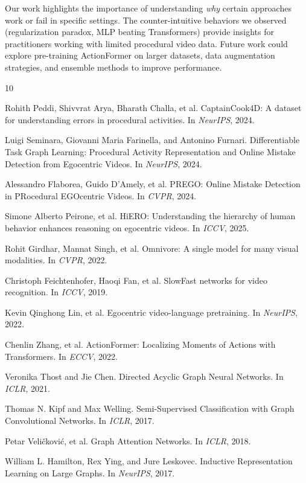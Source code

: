 \documentclass[10pt,twocolumn,letterpaper]{article}
\begin{document}
Our work highlights the importance of understanding \textit{why} certain approaches work or fail in specific settings. The counter-intuitive behaviors we observed (regularization paradox, MLP beating Transformers) provide insights for practitioners working with limited procedural video data. Future work could explore pre-training ActionFormer on larger datasets, data augmentation strategies, and ensemble methods to improve performance.

{\small

\begin{thebibliography}{10}

Rohith Peddi, Shivvrat Arya, Bharath Challa, et al.
\newblock CaptainCook4D: A dataset for understanding errors in procedural activities.
\newblock In \emph{NeurIPS}, 2024.

Luigi Seminara, Giovanni Maria Farinella, and Antonino Furnari.
\newblock Differentiable Task Graph Learning: Procedural Activity Representation and Online Mistake Detection from Egocentric Videos.
\newblock In \emph{NeurIPS}, 2024.

Alessandro Flaborea, Guido D'Amely, et al.
\newblock PREGO: Online Mistake Detection in PRocedural EGOcentric Videos.
\newblock In \emph{CVPR}, 2024.

Simone Alberto Peirone, et al.
\newblock HiERO: Understanding the hierarchy of human behavior enhances reasoning on egocentric videos.
\newblock In \emph{ICCV}, 2025.

Rohit Girdhar, Mannat Singh, et al.
\newblock Omnivore: A single model for many visual modalities.
\newblock In \emph{CVPR}, 2022.

Christoph Feichtenhofer, Haoqi Fan, et al.
\newblock SlowFast networks for video recognition.
\newblock In \emph{ICCV}, 2019.

Kevin Qinghong Lin, et al.
\newblock Egocentric video-language pretraining.
\newblock In \emph{NeurIPS}, 2022.

Chenlin Zhang, et al.
\newblock ActionFormer: Localizing Moments of Actions with Transformers.
\newblock In \emph{ECCV}, 2022.

Veronika Thost and Jie Chen.
\newblock Directed Acyclic Graph Neural Networks.
\newblock In \emph{ICLR}, 2021.

Thomas N. Kipf and Max Welling.
\newblock Semi-Supervised Classification with Graph Convolutional Networks.
\newblock In \emph{ICLR}, 2017.

Petar Veli{\v{c}}kovi{\'c}, et al.
\newblock Graph Attention Networks.
\newblock In \emph{ICLR}, 2018.

William L. Hamilton, Rex Ying, and Jure Leskovec.
\newblock Inductive Representation Learning on Large Graphs.
\newblock In \emph{NeurIPS}, 2017.

\end{thebibliography}
}
\end{document}
